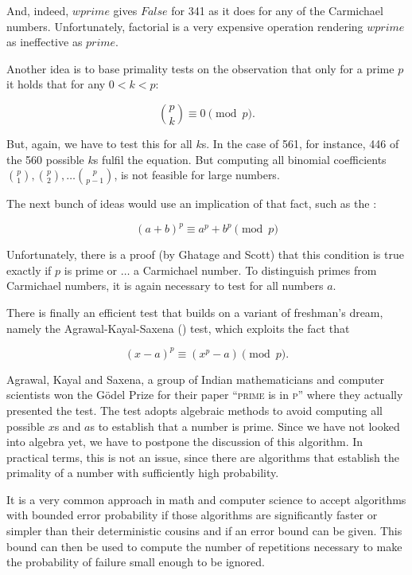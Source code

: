 \documentclass{scrreprt}
\newcommand{\Conid}[1]{\mathit{#1}}
\newcommand{\Varid}[1]{\mathit{#1}}
\begin{document}
And, indeed, \ensuremath{\Varid{wprime}} gives \ensuremath{\Conid{False}} for 341 as
it does for any of the Carmichael numbers.
Unfortunately, factorial is a very expensive operation
rendering \ensuremath{\Varid{wprime}} as ineffective as \ensuremath{\Varid{prime}}.

Another idea is to base primality tests on the observation
that only for a prime $p$ it holds
that for any $0 < k < p$:

\begin{equation}
\binom{p}{k} \equiv 0 \pmod{p}.
\end{equation}

But, again, we have to test this for all $k$s.
In the case of 561, for instance, 446 of the 560 possible $k$s
fulfil the equation.
But computing all binomial coefficients
$\binom{p}{1}, \binom{p}{2}, \dots \binom{p}{p-1}$,
is not feasible for large numbers.

The next bunch of ideas 
would use an implication of that fact,
such as the :

\begin{equation}
(a + b)^p \equiv a^p + b^p \pmod{p}
\end{equation}

Unfortunately, there is a proof
(by Ghatage and Scott) that this condition is true
exactly if $p$ is prime or $\dots$ a Carmichael number.
To distinguish primes from Carmichael numbers,
it is again necessary to test for all numbers $a$.

There is finally an efficient test that builds
on a variant of freshman's dream,
namely the Agrawal-Kayal-Saxena () test,
which exploits the fact that

\begin{equation}
(x - a)^p \equiv (x^p - a) \pmod{p}.
\end{equation}

Agrawal, Kayal and Saxena, 
a group of Indian mathematicians and computer scientists
won the Gödel Prize 
for their paper ``\textsc{prime} is in \textsc{p}'' where they
actually presented the  test.
The test adopts algebraic methods to avoid computing
all possible $x$s and $a$s to establish
that a number is prime. 
Since we have not looked into algebra yet,
we have to postpone the discussion of this algorithm.
In practical terms, this is not an issue,
since there are algorithms 
that establish the primality of a number
with sufficiently high probability.

It is a very common approach in math and computer science
to accept algorithms with bounded error probability
if those algorithms are significantly faster
or simpler than their deterministic cousins
and if an error bound can be given.
This bound can then be used
to compute the number of repetitions
necessary to make the probability of failure 
small enough to be ignored.
\end{document}
